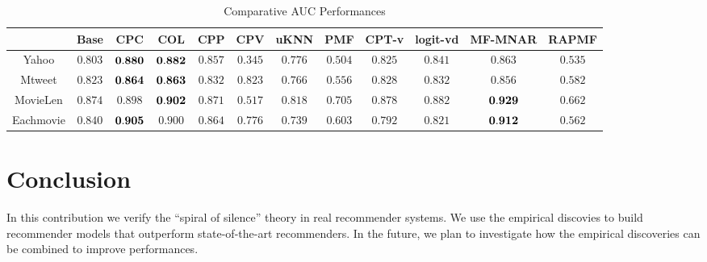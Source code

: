 \documentclass[sigconf]{acmart}
\begin{document}
\begin{table}[tbp]
\centering
\caption{Comparative AUC Performances}\label{tab:AUC}
\centering
\begin{tabular}{|c|c|c|c|c|c|c|c|c|c|c|c|}
\hline
& Base & CPC & COL & CPP & CPV & uKNN & PMF & CPT-v & logit-vd & MF-MNAR & RAPMF \\\hline
\hline
Yahoo & $0.803$ & $\bf{0.880}$ & $\bf{0.882}$ & $0.857$ & $0.345$ & $0.776$ & $0.504$ & $0.825$ & $0.841$ & $0.863$ & $0.535$ \\\hline
Mtweet & $0.823$ & $\bf{0.864}$ & $\bf{0.863}$ & $0.832$ & $0.823$ & $0.766$ & $0.556$ & $0.828$ & $0.832$ & $0.856$ & $0.582$ \\\hline
MovieLen & $0.874$ & $0.898$ & $\bf{0.902}$ & $0.871$ & $0.517$ & $0.818$ & $0.705$ & $0.878$ & $0.882$ & $\bf{0.929}$ & $0.662$ \\\hline
Eachmovie & $0.840$ & $\bf{0.905}$ & $0.900$ & $0.864$ & $0.776$ & $0.739$ & $0.603$ & $0.792$ & $0.821$ & $\bf{0.912}$ & $0.562$ \\\hline
\end{tabular}
\end{table}

\section{Conclusion}\label{sec:conclusion}

In this contribution we verify the ``spiral of silence'' theory in real recommender systems. We use the empirical discovies to build recommender models that outperform state-of-the-art recommenders. In the future, we plan to investigate how the empirical discoveries can be combined to improve performances.



%
%
\end{document}
